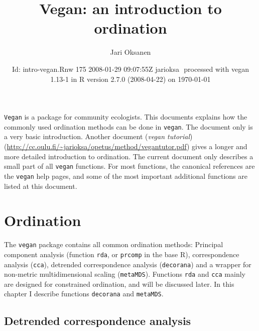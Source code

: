 \documentclass[a4paper,10pt]{amsart}
\title{Vegan: an introduction to ordination}
\author{Jari Oksanen}
\date{$ $Id: intro-vegan.Rnw 175 2008-01-29 09:07:55Z jarioksa $ $
  processed with vegan
1.13-1
in R version 2.7.0 (2008-04-22) on \today}
\begin{document}


\maketitle

\tableofcontents


\noindent \texttt{Vegan} is a package for community ecologists.  This
documents explains how the commonly used ordination methods can be
done in \texttt{vegan}.  The document only is a very basic
introduction.  Another document (\emph{vegan tutorial})
(\url{http://cc.oulu.fi/~jarioksa/opetus/method/vegantutor.pdf}) gives
a longer and more detailed introduction to ordination.  The
current document only describes a small part of all \texttt{vegan}
functions.  For most functions, the canonical references are the
\texttt{vegan} help pages, and some of the most important additional
functions are listed at this document.

\section{Ordination}

The \texttt{vegan} package contains all common ordination methods:
Principal component analysis (function \texttt{rda}, or
\texttt{prcomp} in the base \textsf{R}), correspondence analysis
(\texttt{cca}), detrended correspondence analysis (\texttt{decorana})
and a wrapper for non-metric multidimensional scaling
(\texttt{metaMDS}).  Functions \texttt{rda} and \texttt{cca} mainly
are designed for constrained ordination, and will be discussed later.
In this chapter I describe functions \texttt{decorana} and
\texttt{metaMDS}.

\subsection{Detrended correspondence analysis}
\end{document}
